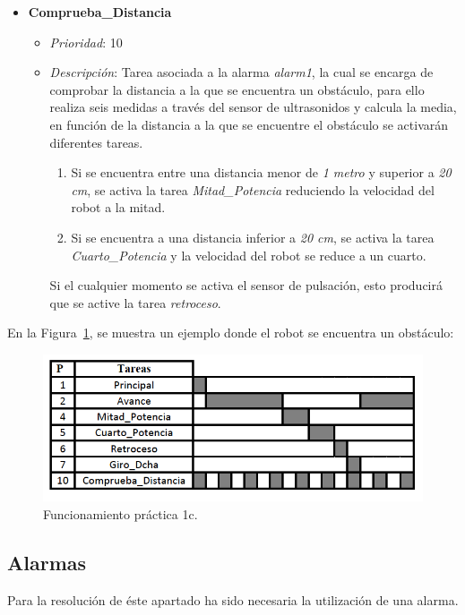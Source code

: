 \begin{itemize}
		\item \textbf{Comprueba\_Distancia}
		\begin{itemize}
			\item \textit{Prioridad}: 10
			\item \textit{Descripción}: Tarea asociada a la alarma \textit{alarm1}, la cual se encarga de comprobar la distancia a la que se encuentra un obstáculo, para ello realiza seis medidas a través del sensor de ultrasonidos y calcula la media, en función de la distancia a la que se encuentre el obstáculo se activarán diferentes tareas.
			\begin{enumerate}
				\item Si se encuentra entre una distancia menor de \textit{1 metro} y superior a \textit{20 cm}, se activa la tarea \textit{Mitad\_Potencia} reduciendo la velocidad del robot a la mitad.
				\item Si se encuentra a una distancia inferior a \textit{20 cm}, se activa la tarea \textit{Cuarto\_Potencia} y la velocidad del robot se reduce a un cuarto.
			\end{enumerate}
			
			Si el cualquier momento se activa el sensor de pulsación, esto producirá que se active la tarea \textit{retroceso}.
				
			\end{itemize}
		
\end{itemize}

En la Figura~\ref{grafico1c}, se muestra un ejemplo donde el robot se encuentra un obstáculo:

\begin{figure}[H]
 \centering
 \includegraphics[scale=0.4]{./img/grafico1c.png}
 \caption{Funcionamiento práctica 1c.}
 \label{grafico1c}
\end{figure}

\subsection{Alarmas}
Para la resolución de éste apartado ha sido necesaria la utilización de una alarma.

